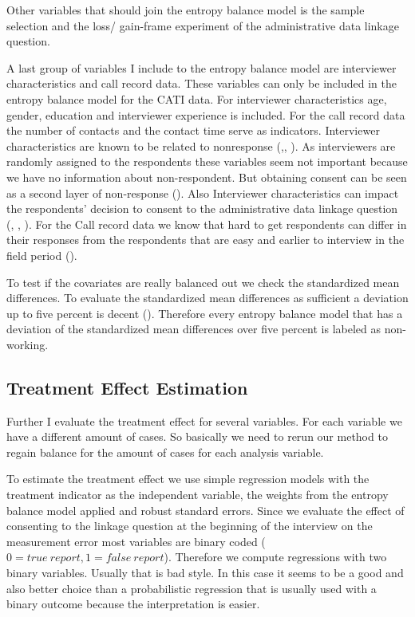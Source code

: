 Other variables that should join the entropy balance model is the sample selection and the loss/ gain-frame experiment of the administrative data linkage question.

A last group of variables I include to the entropy balance model are interviewer characteristics and call record data. These variables can only be included in the entropy balance model for the CATI data. For interviewer characteristics age, gender, education and interviewer experience is included. For the call record data the number of contacts and the contact time serve as indicators. Interviewer characteristics are known to be related to nonresponse (\cite{Grovesetal92},\cite{Grovesetal00}, \cite{Sinibaldietal15}). As interviewers are randomly assigned to the respondents these variables seem not important because we have no information about non-respondent. But obtaining consent can be seen as a second layer of non-response (\cite{Sakshaug13}). Also Interviewer characteristics can impact the respondents' decision to consent to the administrative data linkage question (\cite{Beste11}, \cite{Sakshaugetal13}, \cite{Salaetal10}). For the Call record data we know that hard to get respondents can differ in their responses from the respondents that are easy and earlier to interview in the field period (\cite{Kreuteretal14}).

To test if the covariates are really balanced out we check the standardized mean differences. To evaluate the standardized mean differences as sufficient a deviation up to five percent is decent (\cite{Caliendoetal08}). Therefore every entropy balance model that has a deviation of the standardized mean differences over five percent is labeled as non-working.

\subsection{Treatment Effect Estimation}

Further I evaluate the treatment effect for several variables. For each variable we have a different amount of cases. So basically we need to rerun our method to regain balance for the amount of cases for each analysis variable.

To estimate the treatment effect we use simple regression models with the treatment indicator as the independent variable, the weights from the entropy balance model applied and robust standard errors. Since we evaluate the effect of consenting to the linkage question at the beginning of the interview on the measurement error most variables are binary coded  (\(0=true\ report, 1=false \ report\)). Therefore we compute regressions with two binary variables. Usually that is bad style. In this case it seems to be a good and also better choice than a probabilistic regression that is usually used with a binary outcome because the interpretation is easier.

